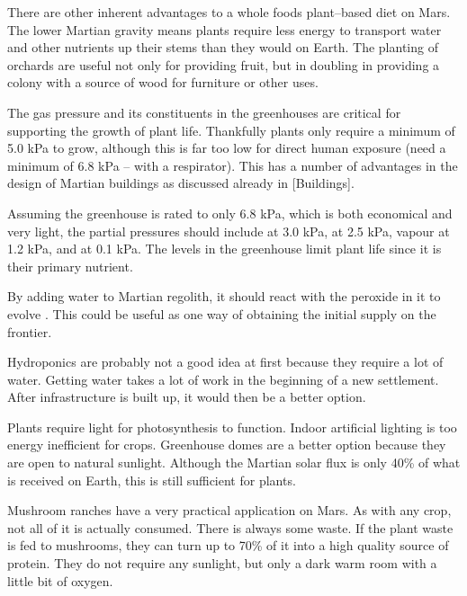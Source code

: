 There are other inherent advantages to a whole foods plant--based diet on Mars. The lower Martian gravity means plants require less energy to transport water and other nutrients up their stems than they would on Earth. The planting of orchards are useful not only for providing fruit, but in doubling in providing a colony with a source of wood for furniture or other uses.

The gas pressure and its constituents in the greenhouses are critical for supporting the growth of plant life. Thankfully plants only require a minimum of 5.0 kPa to grow, although this is far too low for direct human exposure (need a minimum of 6.8 kPa -- with a respirator). This has a number of advantages in the design of Martian buildings as discussed already in [Buildings].

Assuming the greenhouse is rated to only 6.8 kPa, which is both economical and very light, the partial pressures should include  at 3.0 kPa,  at 2.5 kPa,  vapour at 1.2 kPa, and  at 0.1 kPa. The  levels in the greenhouse limit plant life since it is their primary nutrient. 

By adding water to Martian regolith, it should react with the peroxide in it to evolve . This could be useful as one way of obtaining the initial supply on the frontier.

Hydroponics are probably not a good idea at first because they require a lot of water. Getting water takes a lot of work in the beginning of a new settlement. After infrastructure is built up, it would then be a better option.

Plants require light for photosynthesis to function. Indoor artificial lighting is too energy inefficient for crops. Greenhouse domes are a better option because they are open to natural sunlight. Although the Martian solar flux is only 40\% of what is received on Earth, this is still sufficient for plants.

Mushroom ranches have a very practical application on Mars. As with any crop, not all of it is actually consumed. There is always some waste. If the plant waste is fed to mushrooms, they can turn up to 70\% of it into a high quality source of protein. They do not require any sunlight, but only a dark warm room with a little bit of oxygen.


